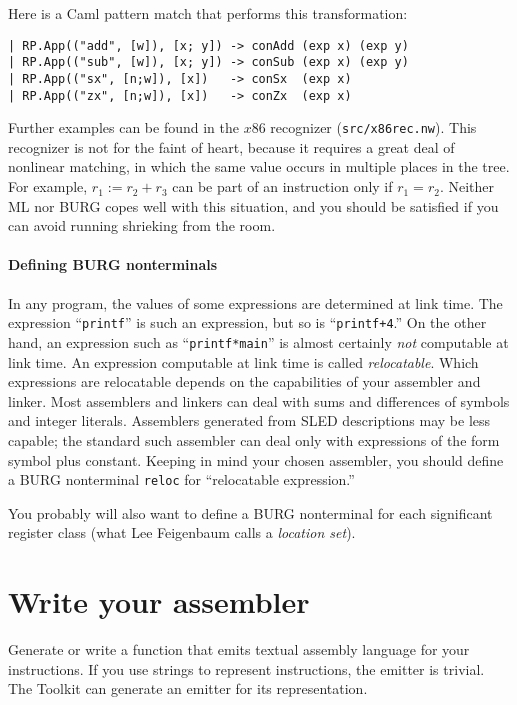 \documentclass[12pt]{article}
\renewcommand\gets{\mathrel{:=}}
\begin{document}
Here is a Caml pattern match that performs this transformation:
\begin{verbatim}
| RP.App(("add", [w]), [x; y]) -> conAdd (exp x) (exp y)
| RP.App(("sub", [w]), [x; y]) -> conSub (exp x) (exp y)
| RP.App(("sx", [n;w]), [x])   -> conSx  (exp x)
| RP.App(("zx", [n;w]), [x])   -> conZx  (exp x)
\end{verbatim}
Further examples can be found in the $x$86 recognizer (\texttt{src/x86rec.nw}).
This recognizer is not for the faint of heart, because it requires a
great deal of nonlinear matching, in which the same value occurs in
multiple places in the tree.
For example, $r_1 \gets r_2 + r_3$ can be part of an instruction only
if $r_1 = r_2$.
Neither ML nor BURG copes well with this situation, and you should be
satisfied if you can avoid running shrieking from the room.


\paragraph{Defining BURG nonterminals}

In any program, the values of some expressions are determined at link
time.
The expression ``\texttt{printf}'' is such an expression, but so is
``\texttt{printf+4}.'' 
On the other hand, an expression such as ``\texttt{printf*main}'' is
almost certainly \emph{not} computable at link time.
An expression computable at link time is called \emph{relocatable}.
Which expressions are relocatable depends on the capabilities of your
assembler and linker.
Most assemblers and linkers can deal with sums and differences of
symbols and integer literals.
Assemblers generated from SLED descriptions may be less capable; the
standard such assembler can deal only with expressions of the form
symbol plus constant.
Keeping in mind
your chosen assembler, you should define a BURG nonterminal
\texttt{reloc} for
``relocatable expression.''

You probably will also want to define a BURG nonterminal for each
significant register class (what Lee Feigenbaum calls a \emph{location
set}). 

\section{Write your assembler}

Generate or write a function that emits textual assembly language for
your instructions.
If you use strings to represent instructions, the emitter is trivial.
The Toolkit can generate an emitter for its representation.
\end{document}
